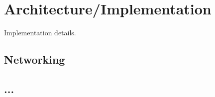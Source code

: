 
\section{Architecture/Implementation}
Implementation details.

\subsection{Networking}

\subsection{...}
